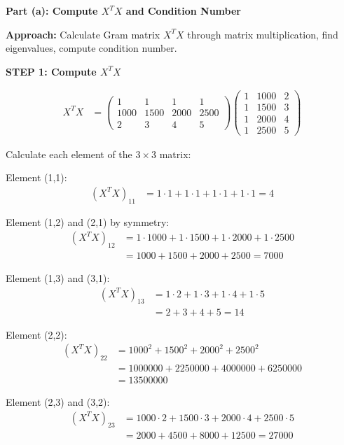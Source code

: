 \documentclass[12pt]{article}
\begin{document}
\begin{solution}

\textbf{Part (a): Compute $X^TX$ and Condition Number}

\textbf{Approach:} Calculate Gram matrix $X^TX$ through matrix multiplication, find eigenvalues, compute condition number.

\textbf{STEP 1: Compute $X^TX$}

\begin{align*}
X^TX &= \begin{pmatrix}
1 & 1 & 1 & 1 \\
1000 & 1500 & 2000 & 2500 \\
2 & 3 & 4 & 5
\end{pmatrix}
\begin{pmatrix}
1 & 1000 & 2 \\
1 & 1500 & 3 \\
1 & 2000 & 4 \\
1 & 2500 & 5
\end{pmatrix}
\end{align*}

Calculate each element of the $3 \times 3$ matrix:

Element (1,1):
\begin{align*}
(X^TX)_{11} &= 1 \cdot 1 + 1 \cdot 1 + 1 \cdot 1 + 1 \cdot 1 = 4
\end{align*}

Element (1,2) and (2,1) by symmetry:
\begin{align*}
(X^TX)_{12} &= 1 \cdot 1000 + 1 \cdot 1500 + 1 \cdot 2000 + 1 \cdot 2500 \\
&= 1000 + 1500 + 2000 + 2500 = 7000
\end{align*}

Element (1,3) and (3,1):
\begin{align*}
(X^TX)_{13} &= 1 \cdot 2 + 1 \cdot 3 + 1 \cdot 4 + 1 \cdot 5 \\
&= 2 + 3 + 4 + 5 = 14
\end{align*}

Element (2,2):
\begin{align*}
(X^TX)_{22} &= 1000^2 + 1500^2 + 2000^2 + 2500^2 \\
&= 1000000 + 2250000 + 4000000 + 6250000 \\
&= 13500000
\end{align*}

Element (2,3) and (3,2):
\begin{align*}
(X^TX)_{23} &= 1000 \cdot 2 + 1500 \cdot 3 + 2000 \cdot 4 + 2500 \cdot 5 \\
&= 2000 + 4500 + 8000 + 12500 = 27000
\end{align*}


\end{solution}
\end{document}
